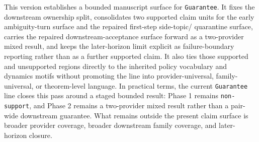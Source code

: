 \documentclass[11pt]{article}
\begin{document}
This version establishes a bounded manuscript surface for \texttt{Guarantee}.
It fixes the downstream ownership split, consolidates two supported claim units
for the early ambiguity-turn surface and the repaired first-step side-topic/
quarantine surface, carries the repaired downstream-acceptance surface forward
as a two-provider mixed result, and keeps the later-horizon limit explicit as
failure-boundary reporting rather than as a further supported claim. It also
ties those supported and unsupported regions directly to the inherited policy
vocabulary and dynamics motifs without promoting the line into
provider-universal, family-universal, or theorem-level language. In practical
terms, the current \texttt{Guarantee} line closes this pass around a staged
bounded result: Phase 1 remains \texttt{non-support}, and Phase 2 remains a
two-provider mixed result rather than a pair-wide downstream guarantee. What
remains outside the present claim surface is broader provider coverage, broader
downstream family coverage, and later-horizon closure.
\end{document}
